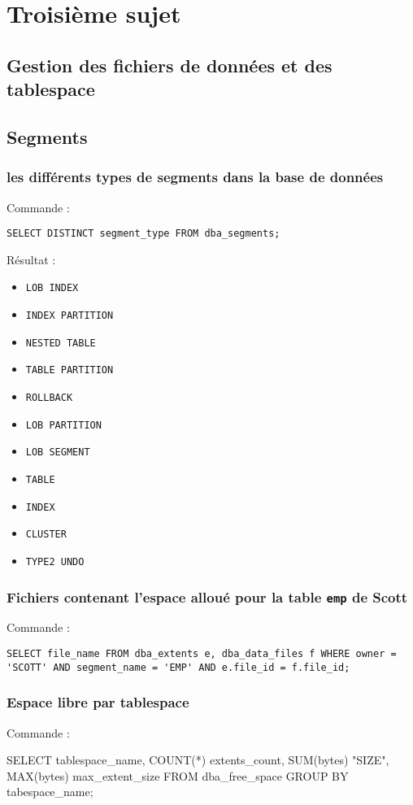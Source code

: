 \section{Troisième sujet}

\subsection{Gestion des fichiers de données et des tablespace}

\subsubsection{}

\subsection{Segments}

\subsubsection{les différents types de segments dans la base de données}

Commande :
\begin{verbatim}
SELECT DISTINCT segment_type FROM dba_segments;
\end{verbatim}

Résultat :
\begin{itemize}
\item \verb|LOB INDEX|
\item \verb|INDEX PARTITION|
\item \verb|NESTED TABLE|
\item \verb|TABLE PARTITION|
\item \verb|ROLLBACK|
\item \verb|LOB PARTITION|
\item \verb|LOB SEGMENT|
\item \verb|TABLE|
\item \verb|INDEX|
\item \verb|CLUSTER|
\item \verb|TYPE2 UNDO|
\end{itemize}

\subsubsection{Fichiers contenant l'espace alloué pour la table \texttt{emp} de Scott}

Commande :
\begin{verbatim}
SELECT file_name FROM dba_extents e, dba_data_files f WHERE owner = 'SCOTT' AND segment_name = 'EMP' AND e.file_id = f.file_id;
\end{verbatim}

\subsubsection{Espace libre par tablespace}

Commande :
\begin{verbatimtab}
SELECT	tablespace_name,
	COUNT(*) extents_count,
	SUM(bytes) "SIZE",
	MAX(bytes) max_extent_size
FROM dba_free_space
GROUP BY tabespace_name;
\end{verbatimtab}